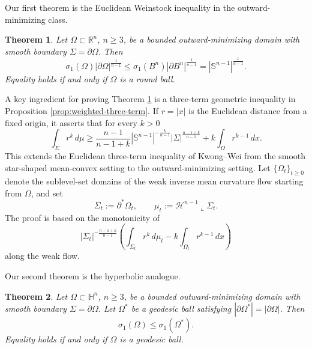 \documentclass[10pt,a4paper]{amsart}
\numberwithin{equation}{section}
\newtheorem{theorem}{Theorem}[section]
\newcommand{\R}{\mathbb R}
\newcommand{\Sn}{\mathbb S}
\newcommand{\HH}{\mathbb H}
\begin{document}
Our first theorem is the Euclidean Weinstock inequality in the outward-minimizing class.


\begin{theorem}\label{thm:weinstock}
Let $\Omega\subset\R^n$, $n\geq3$, be a bounded outward-minimizing domain with smooth  boundary $\Sigma=\partial\Omega$.  Then
\begin{equation}\label{eq:weinstock-main}
    \sigma_1(\Omega)|\partial\Omega|^{\frac1{n-1}}
    \leq
    \sigma_1(B^n)|\partial B^n|^{\frac1{n-1}}
    =|\Sn^{n-1}|^{\frac1{n-1}}.
\end{equation}
Equality holds if and only if $\Omega$ is a round ball.
\end{theorem}


A key ingredient for proving Theorem \ref{thm:weinstock} is a three-term geometric inequality in Proposition \ref{prop:weighted-three-term}.  If $r=|x|$ is the Euclidean distance from a fixed origin, it asserts that for every $k>0$
\begin{equation*}
    \int_\Sigma r^k\,d\mu
    \geq
    \frac{n-1}{n-1+k}|\Sn^{n-1}|^{-\frac{k}{n-1}}
    |\Sigma|^{\frac{n-1+k}{n-1}}
    + k\int_\Omega r^{k-1}\,dx.
\end{equation*}
This extends the Euclidean three-term inequality of Kwong--Wei \cite{KwongWei2023} from the smooth star-shaped mean-convex setting to the outward-minimizing setting. Let $\{\Omega_t\}_{t\geq0}$ denote the sublevel-set domains of the weak
inverse mean curvature flow starting from $\Omega$, and set
\[
    \Sigma_t:=\partial^*\Omega_t,
    \qquad
    \mu_t:=\mathcal H^{n-1}\mathbin{\llcorner}\Sigma_t.
\]
The proof is based on the monotonicity of
\begin{equation*}
    |\Sigma_t|^{-\frac{n-1+k}{n-1}}
    \left(\int_{\Sigma_t}r^k\,d\mu_t
        -k\int_{\Omega_t}r^{k-1}\,dx\right)
\end{equation*}
along the weak flow.

Our second theorem is the hyperbolic analogue.

\begin{theorem}\label{thm:hyp-outward-weinstock}
Let $\Omega\subset\HH^n$, $n\geq3$,  be a bounded outward-minimizing domain with smooth boundary $\Sigma=\partial\Omega$.  Let $\Omega^*$ be a geodesic ball satisfying $ |\partial\Omega^*|=|\partial\Omega|$.  Then
\begin{equation}\label{eq:hyp-weinstock-final}
    \sigma_1(\Omega)\leq\sigma_1(\Omega^*).
\end{equation}
Equality holds if and only if $\Omega$ is a geodesic ball.
\end{theorem}
\end{document}
